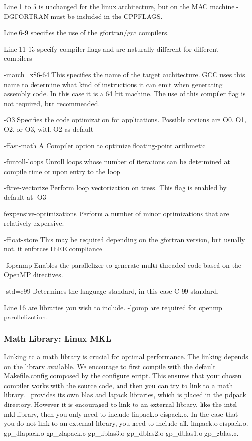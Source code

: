 Line 1 to 5 is unchanged for the linux architecture, but on the MAC machine -DGFORTRAN must be included in the CPPFLAGS. 

Line 6-9 specifies the use of the gfortran/gcc compilers. 

Line 11-13 specify compiler flags and are naturally different for different compilers
\begin{description}
\item{-march=x86-64} This specifies the name of the target architecture. GCC uses this name to determine what kind of instructions it can emit when generating assembly code. In this case it is a 64 bit machine. The use of this compiler flag is not required, but recommended. 
\item{-O3} Specifies the code optimization for applications. Possible options are O0, O1, O2, or O3, with O2 as default
\item{-ffast-math} A Compiler option to optimize floating-point arithmetic 
\item{-funroll-loops} Unroll loops whose number of iterations can be determined at compile time or upon entry to the loop
\item{-ftree-vectorize} Perform loop vectorization on trees. This flag is enabled by default at -O3
\item{fexpensive-optimizations} Perform a number of minor optimizations that are relatively expensive.
\item{-ffloat-store} This may be required depending on the gfortran version, but usually not. it enforces IEEE compliance 
\item{-fopenmp} Enables the parallelizer to generate multi-threaded code based on the OpenMP directives. 
\item{-std=c99} Determines the language standard, in this case C 99 standard. 
  \end{description}
Line 16 are libraries you wish to include. -lgomp are required for openmp parallelization. 

\subsubsection{Math Library: Linux MKL}\label{mkl:ifort}
Linking to a math library is crucial for optimal performance. The linking 
depends on the library available. We encourage to first compile with the 
default Makefile.config composed by the configure script. This ensures that 
your chosen compiler works with the {\lsdalton} source code,
and then you can try to link to a math library. 
\lsdalton\ provides its own blas and lapack libraries, which is placed in the 
pdpack directory. However it is encouraged to link to an external library, like the intel mkl library, 
then you only need to include linpack.o eispack.o.
In the case that you do not link to an external library, you need to include 
all. linpack.o eispack.o. gp\_dlapack.o 
gp\_zlapack.o gp\_dblas3.o gp\_dblas2.o gp\_dblas1.o gp\_zblas.o.

